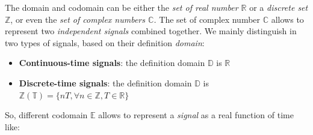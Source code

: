 \documentclass[10pt,a4paper]{report}
\theoremstyle{definition}
\begin{document}
The domain and codomain can be either the \textit{set of real number $\mathbb{R}$}  or a \textit{discrete set} $\mathbb{Z}$, or even the \textit{set of complex numbers $\mathbb{C}$.} The set of complex number $\mathbb{C}$ allows to represent two \textit{independent signals} combined together.
We mainly distinguish in two types of signals, based on their definition \textit{domain}:
\begin{itemize}
	\item \textbf{Continuous-time signals}: the definition domain $\mathbb{D}$ is $\mathbb{R}$
	\item \textbf{Discrete-time signals}: the definition domain $\mathbb{D}$ is $\mathbb{Z(T)} = \{nT, \forall n \in \mathbb{Z}, T \in \mathbb{R}\}$
\end{itemize}
So, different codomain $\mathbb{E}$ allows to represent a \textit{signal} as a real function of time like:
\end{document}
